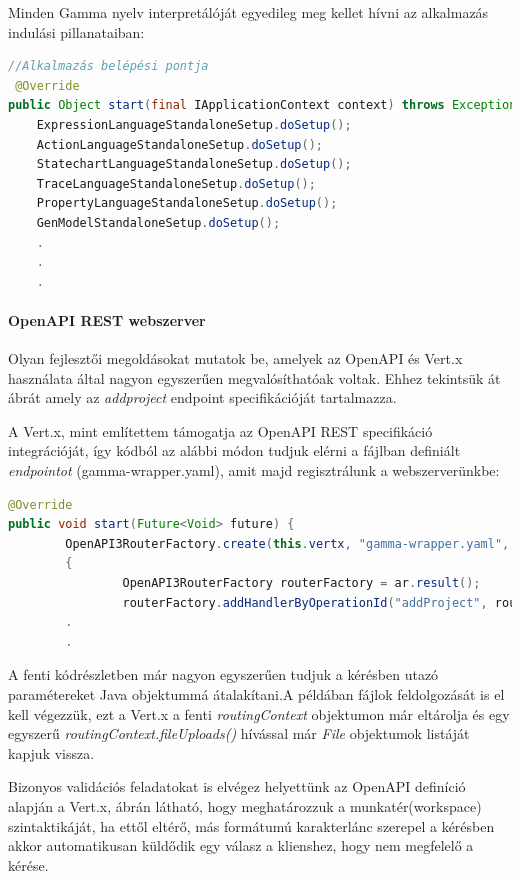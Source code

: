Minden Gamma nyelv interpretálóját egyedileg meg kellet hívni az alkalmazás indulási pillanataiban:

\begin{lstlisting}[language=Java]
//Alkalmazás belépési pontja
 @Override
public Object start(final IApplicationContext context) throws Exception {
	ExpressionLanguageStandaloneSetup.doSetup();
	ActionLanguageStandaloneSetup.doSetup();
	StatechartLanguageStandaloneSetup.doSetup();
	TraceLanguageStandaloneSetup.doSetup();
	PropertyLanguageStandaloneSetup.doSetup();        
	GenModelStandaloneSetup.doSetup();
	.
	.
	.
\end{lstlisting}

\paragraph{OpenAPI REST webszerver} Olyan fejlesztői megoldásokat mutatok be, amelyek az OpenAPI és Vert.x használata által nagyon egyszerűen megvalósíthatóak voltak. Ehhez tekintsük át  ábrát amely az \textit{addproject} endpoint specifikációját tartalmazza.

A Vert.x, mint említettem támogatja az OpenAPI REST specifikáció integrációját, így kódból az alábbi módon tudjuk elérni a fájlban definiált \textit{endpointot} (gamma-wrapper.yaml), amit majd regisztrálunk a webszerverünkbe:
\begin{lstlisting}[language=Java]
@Override
public void start(Future<Void> future) {
        OpenAPI3RouterFactory.create(this.vertx, "gamma-wrapper.yaml", ar ->
		{
                OpenAPI3RouterFactory routerFactory = ar.result();
                routerFactory.addHandlerByOperationId("addProject", routingContext -> {	... }
		.
		.
\end{lstlisting}
A fenti kódrészletben már nagyon egyszerűen tudjuk a kérésben utazó paramétereket Java objektummá átalakítani.A példában fájlok feldolgozását is el kell végezzük, ezt a Vert.x a fenti \textit{routingContext} objektumon már eltárolja és egy egyszerű \textit{routingContext.fileUploads()} hívással már \textit{File} objektumok listáját kapjuk vissza.


Bizonyos validációs feladatokat is elvégez helyettünk az OpenAPI definíció alapján a Vert.x,  ábrán látható, hogy meghatározzuk a munkatér(workspace) szintaktikáját, ha ettől eltérő, más formátumú karakterlánc szerepel a kérésben akkor automatikusan küldődik egy válasz a klienshez, hogy nem megfelelő a kérése.



